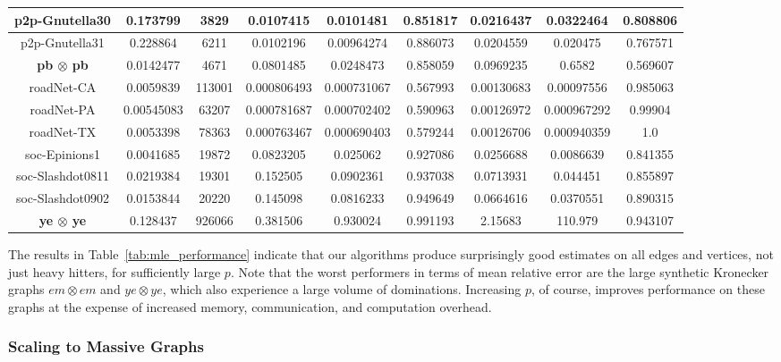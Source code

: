 \documentclass[10]{report}
\begin{document}
\begin{table}
{\begin{tabular}{|c|c|c|c|c|c|c|c|c|}
p2p-Gnutella30&0.173799 & 3829 & 0.0107415 & 0.0101481 & 0.851817 & 0.0216437 & 0.0322464 & 0.808806 \\
\hline
p2p-Gnutella31&0.228864 & 6211 & 0.0102196 & 0.00964274 & 0.886073 & 0.0204559 & 0.020475 & 0.767571 \\
\hline
\textbf{pb $\boldsymbol{\otimes}$ pb}&0.0142477 & 4671 & 0.0801485 & 0.0248473 & 0.858059 & 0.0969235 & 0.6582 & 0.569607 \\
\hline
roadNet-CA&0.0059839 & 113001 & 0.000806493 & 0.000731067 & 0.567993 & 0.00130683 & 0.00097556 & 0.985063 \\
\hline
roadNet-PA&0.00545083 & 63207 & 0.000781687 & 0.000702402 & 0.590963 & 0.00126972 & 0.000967292 & 0.99904 \\
\hline
roadNet-TX&0.0053398 & 78363 & 0.000763467 & 0.000690403 & 0.579244 & 0.00126706 & 0.000940359 & 1.0 \\
\hline
soc-Epinions1&0.0041685 & 19872 & 0.0823205 & 0.025062 & 0.927086 & 0.0256688 & 0.0086639 & 0.841355 \\
\hline
soc-Slashdot0811&0.0219384 & 19301 & 0.152505 & 0.0902361 & 0.937038 & 0.0713931 & 0.044451 & 0.855897 \\
\hline
soc-Slashdot0902&0.0153844 & 20220 & 0.145098 & 0.0816233 & 0.949649 & 0.0664616 & 0.0370551 & 0.890315 \\
\hline
\textbf{ye $\boldsymbol{\otimes}$ ye}&0.128437 & 926066 & 0.381506 & 0.930024 & 0.991193 & 2.15683 & 110.979 & 0.943107 \\
\hline
\end{tabular}}
\end{table}

The results in Table~\ref{tab:mle_performance} indicate that our algorithms produce surprisingly good estimates on all edges and vertices, not just heavy hitters, for sufficiently large $p$. 
Note that the worst performers in terms of mean relative error are the large synthetic Kronecker graphs $em \otimes em$ and $ye \otimes ye$, which also experience a large volume of dominations. 
Increasing $p$, of course, improves performance on these graphs at the expense of increased memory, communication, and computation overhead. 




\subsubsection{Scaling to Massive Graphs}
\end{document}
